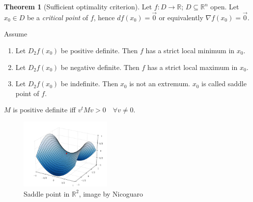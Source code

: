 \documentclass[a4paper,landscape,twocolumn]{article}
\theoremstyle{definition}
\newtheorem{theorem}{Theorem}
\begin{document}
\begin{theorem}[Sufficient optimality criterion]
  Let $f: D \to \mathbb R$; $D \subseteq \mathbb R^n$ open. Let $x_0 \in D$ be a \emph{critical point} of $f$,
  hence $df(x_0) = \vec{0}$ or equivalently $\nabla f(x_0) = \vec{0}$.

  Assume
  \begin{enumerate}
    \item Let $D_2 f(x_0)$ be positive definite. Then $f$ has a strict local minimum in $x_0$.
    \item Let $D_2 f(x_0)$ be negative definite. Then $f$ has a strict local maximum in $x_0$.
    \item Let $D_2 f(x_0)$ be indefinite. Then $x_0$ is not an extremum. $x_0$ is called saddle point of $f$.
  \end{enumerate}
  $M$ is positive definite iff $v^t M v > 0 \quad \forall v \neq 0$.
\end{theorem}

\begin{figure}[!h]
  \begin{center}
    \includegraphics[width=0.4\textwidth]{img/saddle_point.pdf}
    \caption{Saddle point in $\mathbb R^2$, image by Nicoguaro}
    \label{img:saddlepoint}
  \end{center}
\end{figure}
\end{document}
